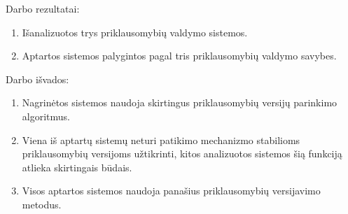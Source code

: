

Darbo rezultatai:


\begin{enumerate}
    \item Išanalizuotos trys priklausomybių valdymo sistemos.
    \item Aptartos sistemos palygintos pagal tris priklausomybių valdymo savybes.
\end{enumerate}


\vspace*{\baselineskip}


Darbo išvados:


\begin{enumerate}
    \item Nagrinėtos sistemos naudoja skirtingus priklausomybių versijų parinkimo algoritmus.
    \item Viena iš aptartų sistemų neturi patikimo mechanizmo stabilioms priklausomybių versijoms užtikrinti, kitos analizuotos sistemos šią funkciją atlieka skirtingais būdais.
    \item Visos aptartos sistemos naudoja panašius priklausomybių versijavimo metodus.
\end{enumerate}

